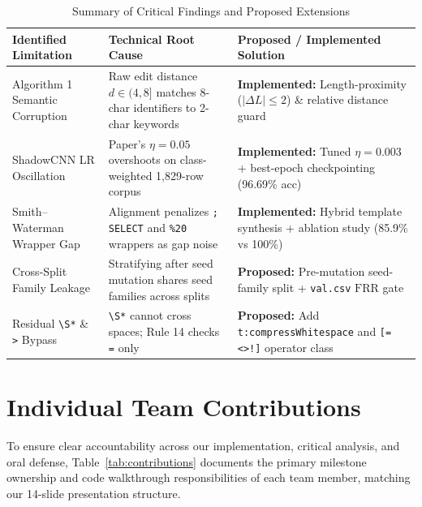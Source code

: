 \documentclass[conference]{IEEEtran}
\newcommand{\FRR}{\ensuremath{\mathrm{FRR}}}
\begin{document}
\begin{table}[t]
\centering
\caption{Summary of Critical Findings and Proposed Extensions}
\label{tab:extensions}
\scriptsize
\setlength{\tabcolsep}{3pt}
\begin{tabular}{L{2.2cm}L{2.8cm}L{2.8cm}}
\toprule
Identified Limitation & Technical Root Cause & Proposed / Implemented Solution\\
\midrule
Algorithm 1 Semantic Corruption & Raw edit distance $d \in (4,8]$ matches 8-char identifiers to 2-char keywords & \textbf{Implemented:} Length-proximity ($|\Delta L|\le 2$) \& relative distance guard\\
ShadowCNN LR Oscillation & Paper's $\eta=0.05$ overshoots on class-weighted 1,829-row corpus & \textbf{Implemented:} Tuned $\eta=0.003$ + best-epoch checkpointing (96.69\% acc)\\
Smith--Waterman Wrapper Gap & Alignment penalizes \texttt{; SELECT} and \texttt{\%20} wrappers as gap noise & \textbf{Implemented:} Hybrid template synthesis + ablation study (85.9\% vs 100\%)\\
Cross-Split Family Leakage & Stratifying after seed mutation shares seed families across splits & \textbf{Proposed:} Pre-mutation seed-family split + \texttt{val.csv} \FRR{} gate\\
Residual \texttt{\textbackslash S*} \& \texttt{>} Bypass & \texttt{\textbackslash S*} cannot cross spaces; Rule 14 checks \texttt{=} only & \textbf{Proposed:} Add \texttt{t:compressWhitespace} and \texttt{[=<>!]} operator class\\
\bottomrule
\end{tabular}
\end{table}

\section{Individual Team Contributions}
To ensure clear accountability across our implementation, critical analysis, and oral defense, Table~\ref{tab:contributions} documents the primary milestone ownership and code walkthrough responsibilities of each team member, matching our 14-slide presentation structure.
\end{document}
